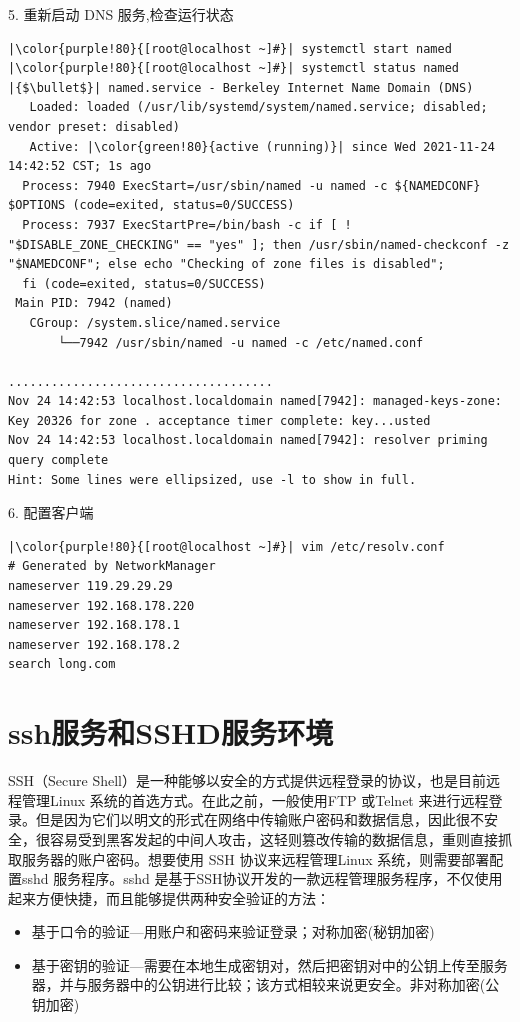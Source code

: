 \begin{ascboxB}{5. 重新启动 DNS 服务,检查运行状态}
\begin{verbatim}
|\color{purple!80}{[root@localhost ~]#}| systemctl start named
|\color{purple!80}{[root@localhost ~]#}| systemctl status named
|{$\bullet$}| named.service - Berkeley Internet Name Domain (DNS)
   Loaded: loaded (/usr/lib/systemd/system/named.service; disabled; vendor preset: disabled)
   Active: |\color{green!80}{active (running)}| since Wed 2021-11-24 14:42:52 CST; 1s ago
  Process: 7940 ExecStart=/usr/sbin/named -u named -c ${NAMEDCONF} $OPTIONS (code=exited, status=0/SUCCESS)
  Process: 7937 ExecStartPre=/bin/bash -c if [ ! "$DISABLE_ZONE_CHECKING" == "yes" ]; then /usr/sbin/named-checkconf -z "$NAMEDCONF"; else echo "Checking of zone files is disabled";  
  fi (code=exited, status=0/SUCCESS)
 Main PID: 7942 (named)
   CGroup: /system.slice/named.service
       └──7942 /usr/sbin/named -u named -c /etc/named.conf

.....................................
Nov 24 14:42:53 localhost.localdomain named[7942]: managed-keys-zone: Key 20326 for zone . acceptance timer complete: key...usted
Nov 24 14:42:53 localhost.localdomain named[7942]: resolver priming query complete
Hint: Some lines were ellipsized, use -l to show in full.
\end{verbatim}
\end{ascboxB}

\begin{ascboxB}{6. 配置客户端}
\begin{verbatim}
|\color{purple!80}{[root@localhost ~]#}| vim /etc/resolv.conf
# Generated by NetworkManager
nameserver 119.29.29.29
nameserver 192.168.178.220
nameserver 192.168.178.1
nameserver 192.168.178.2
search long.com
\end{verbatim}
\end{ascboxB}
\btrule{}

\section{ssh服务和SSHD服务环境}
SSH（Secure Shell）是一种能够以安全的方式提供远程登录的协议，也是目前远程管理Linux 系统的首选方式。在此之前，一般使用FTP 或Telnet 来进行远程登录。但是因为它们以明文的形式在网络中传输账户密码和数据信息，因此很不安全，很容易受到黑客发起的中间人攻击，这轻则篡改传输的数据信息，重则直接抓取服务器的账户密码。想要使用 SSH 协议来远程管理Linux 系统，则需要部署配置sshd 服务程序。sshd 是基于SSH协议开发的一款远程管理服务程序，不仅使用起来方便快捷，而且能够提供两种安全验证的方法：
\begin{itemize}
\item 基于口令的验证—用账户和密码来验证登录；对称加密(秘钥加密)
\item 基于密钥的验证—需要在本地生成密钥对，然后把密钥对中的公钥上传至服务器，并与服务器中的公钥进行比较；该方式相较来说更安全。非对称加密(公钥加密)
\end{itemize}

